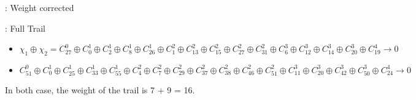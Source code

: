 \documentclass[aspectratio=169,10pt,webfont]{beamer}
\begin{document}

\begin{frame}{\MiniMORUS[640] : Weight corrected}

  \begin{figure}
    \resizebox{!}{0.90\textheight}{%
      
    }
  \end{figure}

\end{frame}



\begin{frame}{\MiniMORUS : Full Trail}

\begin{itemize}
  \item \MiniMORUS[640]
  $$\chi_1 \oplus \chi_2 = C^0_{27} \oplus C^1_{0} \oplus C^1_{2} \oplus C^1_{8} \oplus C^1_{26} \oplus C^2_{1} \oplus C^2_{13} \oplus C^2_{15} \oplus
   C^2_{27} \oplus C^2_{31} \oplus C^3_{6} \oplus C^3_{12} \oplus C^3_{14} \oplus C^3_{20} \oplus C^4_{19} \to 0$$
   \item \MiniMORUS[1280]
  $$C^0_{51} \oplus C^1_{0} \oplus C^1_{25} \oplus C^1_{33} \oplus C^1_{55} \oplus C^2_{4} \oplus C^2_{7} \oplus C^2_{29} \oplus C^2_{37} \oplus
  C^2_{38} \oplus C^2_{46} \oplus C^2_{51} \oplus C^3_{11} \oplus C^3_{20} \oplus C^3_{42} \oplus C^3_{50} \oplus C^4_{24} \to 0$$
\end{itemize}

  In both case, the weight of the trail is 7 + 9 = 16.

\end{frame}

\end{document}
